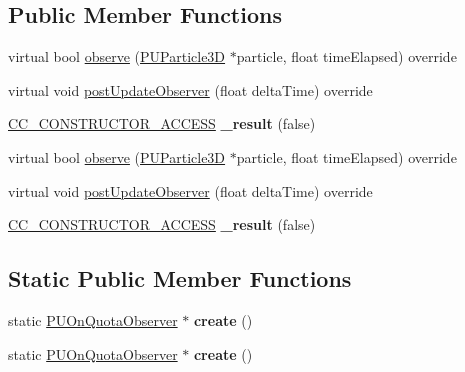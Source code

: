 \subsection*{Public Member Functions}
\begin{DoxyCompactItemize}
\item 
virtual bool \hyperlink{classPUOnQuotaObserver_a0126f46b5e421c15218697814c5922ff}{observe} (\hyperlink{structPUParticle3D}{P\+U\+Particle3D} $\ast$particle, float time\+Elapsed) override
\item 
virtual void \hyperlink{classPUOnQuotaObserver_ab6c30a87b03d57da5ec47a66486c5827}{post\+Update\+Observer} (float delta\+Time) override
\item 
\mbox{\label{classPUOnQuotaObserver_ae97b279a201c9b3d585a0c6dfbf2ccac}} 
\hyperlink{_2cocos2d_2cocos_2base_2ccConfig_8h_a25ef1314f97c35a2ed3d029b0ead6da0}{C\+C\+\_\+\+C\+O\+N\+S\+T\+R\+U\+C\+T\+O\+R\+\_\+\+A\+C\+C\+E\+SS} {\bfseries \+\_\+result} (false)
\item 
virtual bool \hyperlink{classPUOnQuotaObserver_aa0d90169df0c2b2c2cf0d3021c3b674a}{observe} (\hyperlink{structPUParticle3D}{P\+U\+Particle3D} $\ast$particle, float time\+Elapsed) override
\item 
virtual void \hyperlink{classPUOnQuotaObserver_a3ed011d5744f38ea99f0ad4836a6ebd6}{post\+Update\+Observer} (float delta\+Time) override
\item 
\mbox{\label{classPUOnQuotaObserver_ae97b279a201c9b3d585a0c6dfbf2ccac}} 
\hyperlink{_2cocos2d_2cocos_2base_2ccConfig_8h_a25ef1314f97c35a2ed3d029b0ead6da0}{C\+C\+\_\+\+C\+O\+N\+S\+T\+R\+U\+C\+T\+O\+R\+\_\+\+A\+C\+C\+E\+SS} {\bfseries \+\_\+result} (false)
\end{DoxyCompactItemize}
\subsection*{Static Public Member Functions}
\begin{DoxyCompactItemize}
\item 
\mbox{\label{classPUOnQuotaObserver_a517114212f88b65b3cf66fc8635b1add}} 
static \hyperlink{classPUOnQuotaObserver}{P\+U\+On\+Quota\+Observer} $\ast$ {\bfseries create} ()
\item 
\mbox{\label{classPUOnQuotaObserver_a48583d1be061596e4e86c012d028121e}} 
static \hyperlink{classPUOnQuotaObserver}{P\+U\+On\+Quota\+Observer} $\ast$ {\bfseries create} ()
\end{DoxyCompactItemize}
